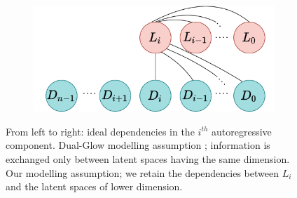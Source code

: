\begin{figure}[h]
\begin{subfigure}{0.31\textwidth}
        \includegraphics[width=\textwidth]{Outline/figures/caflow/oursdependencies.png}
        \end{subfigure}
    \caption{From left to right: ideal dependencies in the $i^{th}$ autoregressive component. Dual-Glow modelling assumption \cite{Dual-Glow}; information is exchanged only between latent spaces having the same dimension. Our modelling assumption; we retain the dependencies between $L_i$ and the latent spaces of lower dimension.}	\label{fig:dependencies}
    \end{figure}

